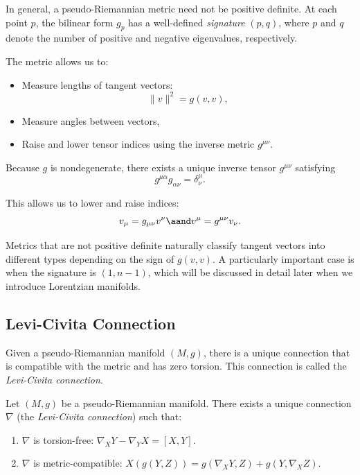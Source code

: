 In general, a pseudo-Riemannian metric need not be positive definite. At each point $p$, the bilinear form $g_p$ has a well-defined \emph{signature} $(p, q)$, where $p$ and $q$ denote the number of positive and negative eigenvalues, respectively.

The metric allows us to:
\begin{itemize}
  \item Measure lengths of tangent vectors:
    \[%
      \|v\|^2 = g(v,v)
    ,\]%
  \item Measure angles between vectors,
  \item Raise and lower tensor indices using the inverse metric $g^{\mu\nu}$.
\end{itemize}

Because $g$ is nondegenerate, there exists a unique inverse tensor $g^{\mu\nu}$ satisfying
\[%
  g^{\mu\alpha} g_{\alpha\nu} = \delta^\mu_{\nu}
.\]%

This allows us to lower and raise indices:
\[%
  v_\mu = g_{\mu\nu} v^\nu \aand v^\mu = g^{\mu\nu} v_\nu
.\]%

Metrics that are not positive definite naturally classify tangent vectors into different types depending on the sign of $g(v, v)$. A particularly important case is when the signature is $(1, n-1)$, which will be discussed in detail later when we introduce Lorentzian manifolds.

\subsection{Levi-Civita Connection}

Given a pseudo-Riemannian manifold $(M, g)$, there is a unique connection that is compatible with the metric and has zero torsion. This connection is called the \emph{Levi-Civita connection}.
\begin{theorem}
  Let $(M, g)$ be a pseudo-Riemannian manifold. There exists a unique connection $\nabla$ (the \emph{Levi-Civita connection}) such that:
  \begin{enumerate}
    \item $\nabla$ is torsion-free: $\nabla_X Y - \nabla_Y X = [X,Y]$.
    \item $\nabla$ is metric-compatible: $X(g(Y,Z)) = g(\nabla_X Y, Z) + g(Y, \nabla_X Z)$.
  \end{enumerate}
\end{theorem}

